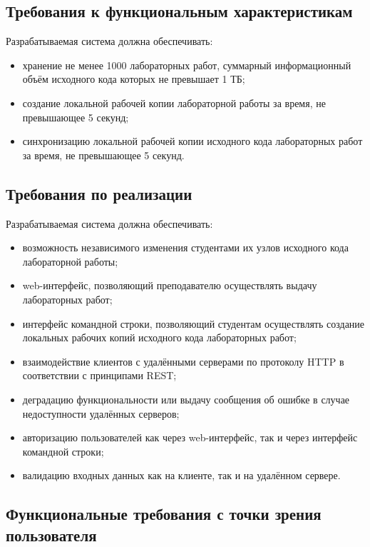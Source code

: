 \documentclass{bmstu}
\begin{document}
  \subsection{Требования к функциональным характеристикам}

  Разрабатываемая система должна обеспечивать:
  \begin{itemize}[label=---]
    \item хранение не менее 1000 лабораторных работ, суммарный
      информационный объём исходного кода которых не превышает 1 ТБ;
    \item создание локальной рабочей копии лабораторной работы за
      время, не превышающее 5 секунд;
    \item синхронизацию локальной рабочей копии исходного кода
      лабораторных работ за время, не превышающее 5 секунд.
  \end{itemize}

  \subsection{Требования по реализации}

  Разрабатываемая система должна обеспечивать:
  \begin{itemize}[label=---]
    \item возможность независимого изменения студентами их узлов
      исходного кода лабораторной работы;
    \item web-интерфейс, позволяющий преподавателю осуществлять выдачу
      лабораторных работ;
    \item интерфейс командной строки, позволяющий студентам
      осуществлять создание локальных рабочих копий исходного кода
      лабораторных работ;
    \item взаимодействие клиентов с удалёнными серверами по протоколу
      HTTP в соответствии с принципами REST;
    \item деградацию функциональности или выдачу сообщения об ошибке в
      случае недоступности удалённых серверов;
    \item авторизацию пользователей как через web-интерфейс, так и
      через интерфейс командной строки;
    \item валидацию входных данных как на клиенте, так и на удалённом
      сервере.
  \end{itemize}

  \subsection{Функциональные требования с точки зрения пользователя}
\end{document}
